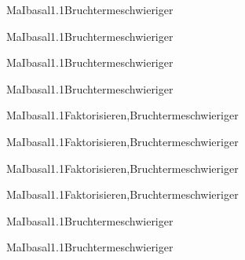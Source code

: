 \documentclass[12pt]{article}
\begin{document}
    \begin{Add}{MaI}{basal1.1}{Bruchterme}{schwieriger}
    \solution{ }
    \end{Add}
    \begin{Add}{MaI}{basal1.1}{Bruchterme}{schwieriger}
    \end{Add}
    

    \begin{Add}{MaI}{basal1.1}{Bruchterme}{schwieriger}
    \solution{ }
    \end{Add}
    \begin{Add}{MaI}{basal1.1}{Bruchterme}{schwieriger}
    \end{Add}
    

   \begin{Add}{MaI}{basal1.1}{Faktorisieren,Bruchterme}{schwieriger}
   \solution{ }
   \end{Add}
   \begin{Add}{MaI}{basal1.1}{Faktorisieren,Bruchterme}{schwieriger}
   \end{Add}
   

   \begin{Add}{MaI}{basal1.1}{Faktorisieren,Bruchterme}{schwieriger}
   \solution{ }
   \end{Add}
   \begin{Add}{MaI}{basal1.1}{Faktorisieren,Bruchterme}{schwieriger}
   \end{Add}
   

   \begin{Add}{MaI}{basal1.1}{Bruchterme}{schwieriger}
   \solution{ }
   \end{Add}
   \begin{Add}{MaI}{basal1.1}{Bruchterme}{schwieriger}
   \end{Add}
   
\end{document}
